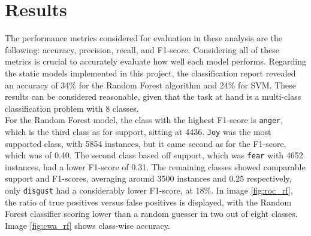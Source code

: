 \chapter*{Results}
\label{ch:results}
The performance metrics considered for evaluation in these analysis are the
following: accuracy, precision, recall, and F1-score. Considering all of these
metrics is crucial to accurately evaluate how well each model performs.
Regarding the static models implemented in this project, the classification
report revealed an accuracy of 34\% for the Random Forest algorithm and 24\% for
SVM. These results can be considered reasonable, given that the task at hand
is a multi-class classification problem with 8 classes.\\
For the Random Forest model, the class with the highest F1-score is \texttt{anger},
which is the third class as for support, sitting at 4436. 
\texttt{Joy} was the most supported class, with 5854 instances, but it came second
as for the F1-score, which was of 0.40. The second class based off support, which
was \texttt{fear} with 4652 instances, had a lower F1-score of 0.31. 
The remaining classes showed comparable support and F1-scores, averaging around
3500 instances and 0.25 respectively, only \texttt{disgust} had a considerably
lower F1-score, at 18\%. In image \ref{fig:roc_rf}, the ratio of true positives versus false positives is
displayed, with the Random Forest classifier scoring lower than a random guesser in
two out of eight classes. Image \ref{fig:cwa_rf} shows class-wise accuracy.\\
